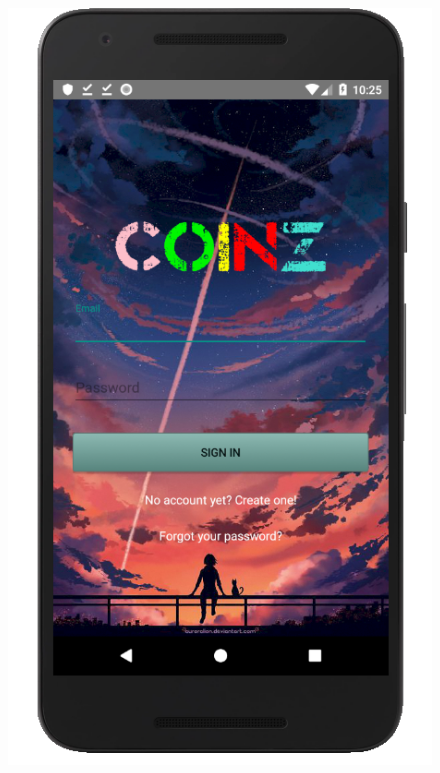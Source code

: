 \documentclass[12pt]{article}
\begin{document}
\begin{figure}
	\includegraphics[scale=0.25]{LoginActivity.png}

\end{figure}
\end{document}
